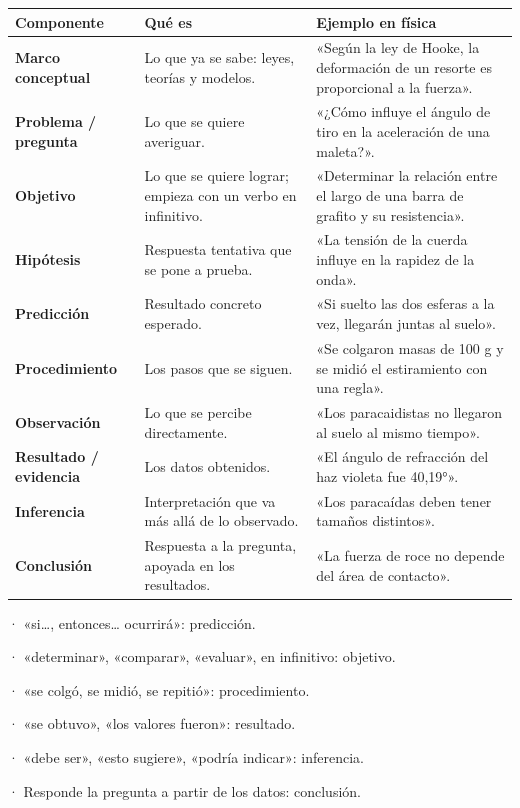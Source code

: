  
\begin{center}\small
\begin{tabularx}{\linewidth}{@{}>{\raggedright\arraybackslash\hsize=0.62\hsize}X>{\raggedright\arraybackslash\hsize=1.19\hsize}X>{\raggedright\arraybackslash\hsize=1.19\hsize}X@{}}
\toprule
\textbf{Componente} & \textbf{Qué es} & \textbf{Ejemplo en física} \\
\midrule
\textbf{Marco conceptual} & Lo que ya se sabe: leyes, teorías y modelos. & «Según la ley de Hooke, la deformación de un resorte es proporcional a la fuerza». \\
\textbf{Problema / pregunta} & Lo que se quiere averiguar. & «¿Cómo influye el ángulo de tiro en la aceleración de una maleta?». \\
\textbf{Objetivo} & Lo que se quiere lograr; empieza con un verbo en infinitivo. & «Determinar la relación entre el largo de una barra de grafito y su resistencia». \\
\textbf{Hipótesis} & Respuesta tentativa que se pone a prueba. & «La tensión de la cuerda influye en la rapidez de la onda». \\
\textbf{Predicción} & Resultado concreto esperado. & «Si suelto las dos esferas a la vez, llegarán juntas al suelo». \\
\textbf{Procedimiento} & Los pasos que se siguen. & «Se colgaron masas de 100 g y se midió el estiramiento con una regla». \\
\textbf{Observación} & Lo que se percibe directamente. & «Los paracaidistas no llegaron al suelo al mismo tiempo». \\
\textbf{Resultado / evidencia} & Los datos obtenidos. & «El ángulo de refracción del haz violeta fue 40,19°». \\
\textbf{Inferencia} & Interpretación que va más allá de lo observado. & «Los paracaídas deben tener tamaños distintos». \\
\textbf{Conclusión} & Respuesta a la pregunta, apoyada en los resultados. & «La fuerza de roce no depende del área de contacto». \\
\bottomrule
\end{tabularx}
\end{center}
  
\begin{clave} · «si\dots{}, entonces\dots{} ocurrirá»: predicción.\par · «determinar», «comparar», «evaluar», en infinitivo: objetivo.\par · «se colgó, se midió, se repitió»: procedimiento.\par · «se obtuvo», «los valores fueron»: resultado.\par · «debe ser», «esto sugiere», «podría indicar»: inferencia.\par · Responde la pregunta a partir de los datos: conclusión.\end{clave}
  
